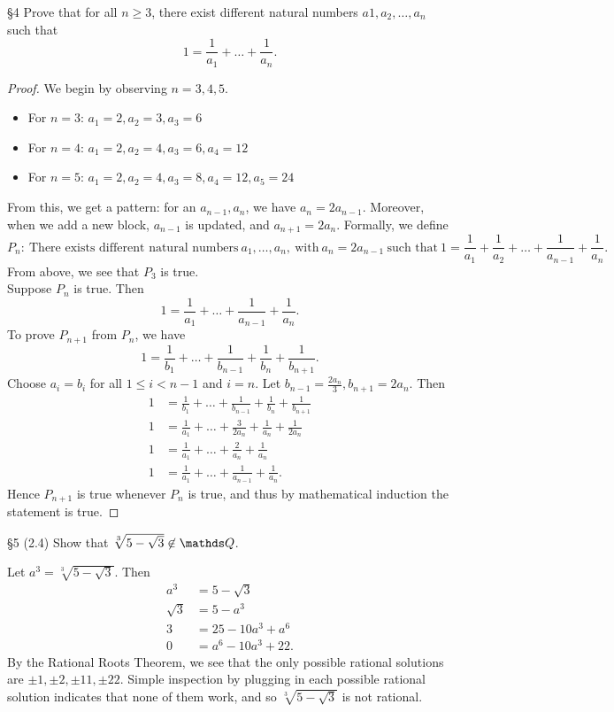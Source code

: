 \documentclass{homework}
\begin{document}
\begin{problem}{\S 4}
  Prove that for all $n\ge 3$, there exist different natural numbers $a1,a_2,\ldots, a_n$ such that
  \[
    1 = \frac{1}{a_1} + \ldots + \frac{1}{a_n}
  .\] 
\end{problem}
\begin{proof}[Proof]
  We begin by observing $n=3,4,5$.
   \begin{itemize}
    \item For $n=3$:  $ a_1=2,a_2=3,a_3=6$
    \item For $n=4$:  $ a_1=2,a_2=4,a_3=6,a_4=12$
    \item For $n=5$:  $ a_1=2,a_2=4,a_3=8,a_4=12,a_5=24$
  \end{itemize}
  From this, we get a pattern: for an $a_{n-1},a_n$, we have  $a_n = 2a_{n-1}$. Moreover, when we
  add a new block,  $a_{n-1}$ is updated, and $a_{n+1}=2a_n$. Formally, we define  \[
    P_n: ~\text{There exists different natural numbers}~a_1,\ldots, a_n,
    ~\text{with}~a_n=2a_{n-1}~\text{such
    that}~1=\frac{1}{a_1}+\frac{1}{a_2}+\ldots+\frac{1}{a_{n-1}}+\frac{1}{a_n}
  .\] 
  From above, we see that $P_3$ is true.\\
  Suppose $P_n$ is true. Then  \[
    1 = \frac{1}{a_1}  +\ldots+\frac{1}{a_{n-1}}+\frac{1}{a_n}
  .\] To prove $P_{n+1}$ from  $P_n$, we have  \[
  1 = \frac{1}{b_1} + \ldots+\frac{1}{b_{n-1}} + \frac{1}{b_n} + \frac{1}{b_{n+1}}
.\] Choose $a_i=b_i$ for all  $1\le i < n-1$ and $i=n$. Let  $b_{n-1}=\frac{2a_n}{3},
  b_{n+1}=2a_n$. Then
  \begin{align*}
    1 &= \frac{1}{b_1}+\ldots+\frac{1}{b_{n-1}}+\frac{1}{b_n}+\frac{1}{b_{n+1}} \\
    1 &= \frac{1}{a_1}+\ldots+\frac{3}{2a_n}+\frac{1}{a_n}+\frac{1}{2a_n} \\
    1 &= \frac{1}{a_1}+\ldots+\frac{2}{a_n}+\frac{1}{a_n} \\
    1 &= \frac{1}{a_1}+\ldots+\frac{1}{a_{n-1}}+\frac{1}{a_n}
  .\end{align*}
  Hence $P_{n+1}$ is true whenever  $P_n$ is true, and thus by mathematical induction the statement
  is true.
\end{proof}

\begin{problem}{\S 5}
  (2.4) Show that $\sqrt[3]{5-\sqrt{3} } \not\in \Q$.
\end{problem}
\begin{solution}
  Let $a^3=\sqrt[3]{5-\sqrt{3} }$. Then
  \begin{align*}
    a^3&= 5-\sqrt{3}  \\
    \sqrt{3} &= 5-a^3 \\
    3 &= 25-10a^3+a^{6} \\
    0 &= a^{6}-10a^3+22
  .\end{align*}
  By the Rational Roots Theorem, we see that the only possible rational solutions are $\pm 1,\pm
  2,\pm 11,\pm 22$. Simple inspection by plugging in each possible rational solution indicates that
  none of them work, and so $\sqrt[3]{5-\sqrt{3} }$ is not rational.
\end{solution}
\end{document}
